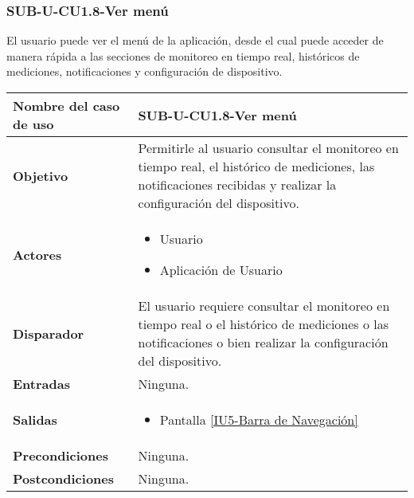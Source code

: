 \subsubsection{SUB-U-CU1.8-Ver menú}\label{SUB-U-CU1.8}
El usuario puede ver el menú de la aplicación, desde el cual puede acceder de manera rápida a las secciones de monitoreo en tiempo real, históricos de mediciones, notificaciones y configuración de dispositivo.

\begin{longtable}{|J{5cm}|J{10.3cm}|}
	\hline
	\textbf{Nombre del caso de uso} &
		SUB-U-CU1.8-Ver menú \\ \hline
	\textbf{Objetivo} &
		Permitirle al usuario consultar el monitoreo en tiempo real, el histórico de mediciones, las notificaciones recibidas y realizar la configuración del dispositivo. \\ \hline
	\textbf{Actores} &
	    \begin{itemize}
		    \item Usuario
		    \item Aplicación de Usuario
		\end{itemize}\\ \hline
	\textbf{Disparador} & 
		El usuario requiere consultar el monitoreo en tiempo real o el histórico de mediciones o las notificaciones o bien realizar la configuración del dispositivo.\\ \hline 
	\textbf{Entradas} & Ninguna.
		\\ \hline 
	\textbf{Salidas} & 
		\begin{itemize}
			\item Pantalla \hyperref[fig:Barra de navegacion]{[IU5-Barra de Navegación]} 
		\end{itemize} \\ \hline
	\textbf{Precondiciones} &
		Ninguna.\\ \hline
	\textbf{Postcondiciones} & Ninguna.

\end{longtable}
